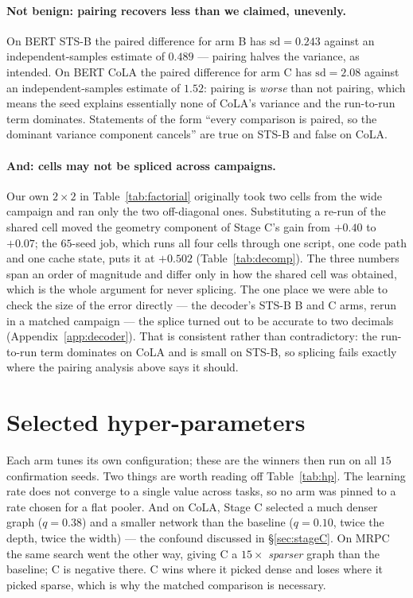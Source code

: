 \documentclass{article}
\begin{document}
\paragraph{Not benign: pairing recovers less than we claimed, unevenly.} On
BERT STS-B the paired difference for arm B has $\mathrm{sd}=0.243$ against an
independent-samples estimate of $0.489$ --- pairing halves the variance, as
intended. On BERT CoLA the paired difference for arm C has $\mathrm{sd}=2.08$
against an independent-samples estimate of $1.52$: pairing is \emph{worse} than
not pairing, which means the seed explains essentially none of CoLA's variance
and the run-to-run term dominates. Statements of the form ``every comparison is
paired, so the dominant variance component cancels'' are true on STS-B and false
on CoLA.

\paragraph{And: cells may not be spliced across campaigns.} Our own $2\times2$
in Table~\ref{tab:factorial} originally took two cells from the wide campaign
and ran only the two off-diagonal ones. Substituting a re-run of the shared cell
moved the geometry component of Stage C's gain from $+0.40$ to $+0.07$; the
$65$-seed job, which runs all four cells through one script, one code path and
one cache state, puts it at $+0.502$ (Table~\ref{tab:decomp}). The three
numbers span an order of magnitude and differ only in how the shared cell was
obtained, which is the whole argument for never splicing. The one place we were
able to check the size of the error directly --- the decoder's STS-B B and C
arms, rerun in a matched campaign --- the splice turned out to be accurate to two
decimals (Appendix~\ref{app:decoder}). That is consistent rather than
contradictory: the run-to-run term dominates on CoLA and is small on STS-B, so
splicing fails exactly where the pairing analysis above says it should.

\section{Selected hyper-parameters}
\label{app:hp}

Each arm tunes its own configuration; these are the winners then run on all $15$
confirmation seeds. Two things are worth reading off Table~\ref{tab:hp}. The
learning rate does not converge to a single value across tasks, so no arm was
pinned to a rate chosen for a flat pooler. And on CoLA, Stage C selected a much
denser graph ($q = 0.38$) and a smaller network than the baseline ($q = 0.10$,
twice the depth, twice the width) --- the confound discussed in
\S\ref{sec:stageC}. On MRPC the same search went the other way, giving C a
$15\times$ \emph{sparser} graph than the baseline; C is negative there. C wins
where it picked dense and loses where it picked sparse, which is why the matched
comparison is necessary.
\end{document}

